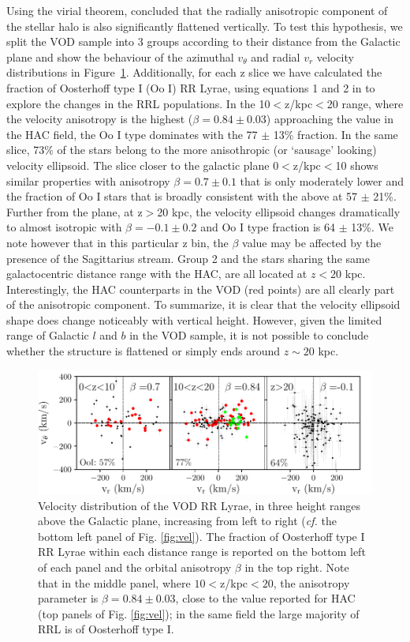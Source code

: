 \documentclass[fleqn,usenatbib]{mnras}
\begin{document}
Using the virial theorem, \citet{actionhalo} concluded that the
radially anisotropic component of the stellar halo is also
significantly flattened vertically. To test this hypothesis, we split
the VOD sample into 3 groups according to their distance from the
Galactic plane and show the behaviour of the azimuthal $v_{\theta}$
and radial $v_{r}$ velocity distributions in
Figure~\ref{fig:VOD_vel}. Additionally, for each z slice we have
calculated the fraction of Oosterhoff type I (Oo I) RR Lyrae, using
equations 1 and 2 in \citet{Be2018} to explore the changes in the RRL
populations. In the 10$<$z/kpc$<$20 range, where the velocity anisotropy
is the highest ($\beta = 0.84 \pm 0.03$) approaching the value in the
HAC field, the Oo I type dominates with the 77 $\pm$ 13\% fraction. In the same
slice, 73\% of the stars belong to the more anisothropic (or `sausage'
looking) velocity ellipsoid. The slice closer to the galactic plane 
0$<$z/kpc$<$10 shows similar properties with anisotropy $\beta
= 0.7 \pm 0.1$ that is only moderately lower and the fraction of Oo I stars
that is broadly consistent with the above at 57 $\pm$ 21\%. Further from
the plane, at z$>$20 kpc, the velocity ellipsoid changes dramatically
to almost isotropic with $\beta = -0.1 \pm 0.2$ and Oo I type fraction
is 64 $\pm$ 13\%. We note however that in this particular z bin, the
$\beta$ value may be affected by the presence of the Sagittarius
stream. Group 2 and the stars sharing the same galactocentric distance
range with the HAC, are all located at $z<20$ kpc. Interestingly, the
HAC counterparts in the VOD (red points) are all clearly part of the
anisotropic component. To summarize, it is clear that the velocity
ellipsoid shape does change noticeably with vertical height. However,
given the limited range of Galactic $l$ and $b$ in the VOD sample, it
is not possible to conclude whether the structure is flattened or
simply ends around $z\sim20$ kpc.
%   
%
\begin{figure}
	        \includegraphics[scale=0.55]{VOD_velocities_vphi_zcuts.pdf}
\vspace{-0.45cm}
   \caption{Velocity distribution of the VOD RR Lyrae, in three
     height ranges above the Galactic plane, increasing from left to
     right ({\it cf.} the bottom left panel of Fig.
     \ref{fig:vel}). The fraction of Oosterhoff type I RR Lyrae within
     each distance range is reported on the bottom left of each panel
     and the orbital anisotropy $\beta$ in the top right. Note that in
     the middle panel, where $10<$z/kpc$<20$, the anisotropy
     parameter is $\beta=0.84\pm0.03$, close to the value reported for
     HAC (top panels of Fig.  \ref{fig:vel}); in the same field the
     large majority of RRL is of Oosterhoff type I.}
    \label{fig:VOD_vel}
\end{figure}
%
\end{document}
